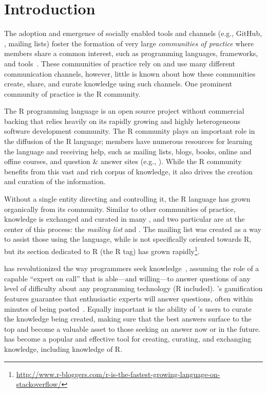 \section{Introduction}
\label{cha:introduction}
The adoption and emergence of socially enabled tools and channels (e.g., GitHub, \SO, mailing lists) foster the formation of very large \textit{communities of practice} where members share a common interest, such as programming languages, frameworks, and tools~\cite{Storey2014}. These communities of practice rely on and use many different communication channels, however, little is known about how these communities create, share, and curate knowledge using such channels. One prominent community of practice is the R community.

The R programming language is an open source project without commercial backing that relies heavily on its rapidly growing and highly heterogeneous software development community. The R community plays an important role in the diffusion of the R language; members have numerous resources for learning the language and receiving help, such as mailing lists, blogs, books, online and offine courses, and question \& answer sites (e.g., \SO). While the R community benefits from this vast and rich corpus of knowledge, it also drives the creation and curation of the information.

Without a single entity directing and controlling it, the R language has grown organically from its community. Similar to other communities of practice, knowledge is exchanged and curated in many \channels, and two particular \channels are at the center of this process: the \textit{\RH mailing list} and \textit{\SO}. The \RH mailing list was created as a way to assist those using the language, while \SO is not specifically oriented towards R, but its section dedicated to R (the R tag) has grown rapidly\footnote{\href{http://www.r-bloggers.com/r-is-the-fastest-growing-language-on-stackoverflow/}{http://www.r-bloggers.com/r-is-the-fastest-growing-language-on-stackoverflow/}}.

\SO has revolutionized the way programmers seek knowledge~\cite{li2013help,Vasilescu2014c}, assuming the role of a capable ``expert on call'' that is able---and willing---to answer questions of any level of difficulty about any programming technology (R included). \SO's gamification features guarantee that enthusiastic experts will answer questions, often within minutes of being posted~\cite{Mamykina2011}. Equally important is the ability of \SO's users to curate the knowledge being created, making sure that the best answers surface to the top and become a valuable asset to those seeking an answer now or in the future. \SO has become a popular and effective tool for creating, curating, and exchanging knowledge, including knowledge of R.

